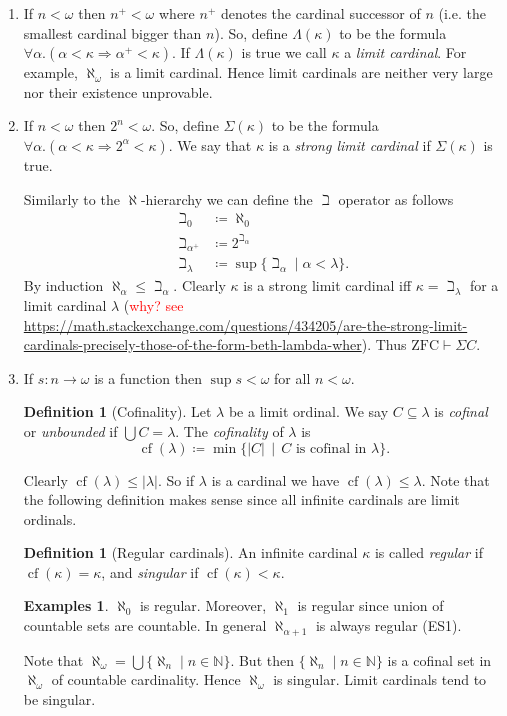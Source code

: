 \documentclass{report}
\DeclareMathOperator{\cf}{cf}
\theoremstyle{definition}
\theoremstyle{plain}
\theoremstyle{definition}
\newtheorem{defn}[thm]{Definition}
\newtheorem{egs}[thm]{Examples}
\begin{document}
	\begin{enumerate}
		\item If $n<\omega$ then $n^+ < \omega$ where $n^+$ denotes the cardinal successor of $n$ (i.e. the smallest cardinal bigger than $n$). So, define $\Lambda(\kappa)$ to be the formula $\forall \alpha. (\alpha < \kappa \Rightarrow \alpha^+ < \kappa)$. If $\Lambda(\kappa)$ is true we call $\kappa$ a \emph{limit cardinal}. For example, $\aleph_{\omega}$ is a limit cardinal. Hence limit cardinals are neither very large nor their existence unprovable.
		\item If $n<\omega$ then $2^n< \omega$. So, define $\Sigma(\kappa)$ to be the formula $\forall \alpha.(\alpha < \kappa \Rightarrow 2^{\alpha} < \kappa)$. We say that $\kappa$ is a \emph{strong limit cardinal} if $\Sigma(\kappa)$ is true.
		
		Similarly to the $\aleph$-hierarchy we can define the $\beth$ operator as follows
		\begin{align*}
			\beth_0 &\coloneqq \aleph_0\\
			\beth_{\alpha^+} &\coloneqq 2^{\beth_{\alpha}}\\
			\beth_{\lambda} &\coloneqq \sup\{\beth_\alpha \mid \alpha < \lambda\}. 
		\end{align*}
		By induction $\aleph_{\alpha} \leq \beth_{\alpha}$. Clearly $\kappa$ is a strong limit cardinal iff $\kappa = \beth_{\lambda}$ for a limit cardinal $\lambda$ (\textcolor{red}{why? see \url{https://math.stackexchange.com/questions/434205/are-the-strong-limit-cardinals-precisely-those-of-the-form-beth-lambda-wher}}). Thus $\text{ZFC} \vdash \Sigma C$.
		
		\item If $s\colon n \to \omega$ is a function then $\sup s < \omega$ for all $n<\omega$.
		\begin{defn}[Cofinality]
			Let $\lambda$ be a limit ordinal. We say $C\subseteq \lambda$ is \emph{cofinal} or \emph{unbounded} if $\bigcup C = \lambda$. The \emph{cofinality} of $\lambda$ is
			\[
				\cf(\lambda)\coloneqq \min\{|C| \,\mid \, C \text{ is cofinal in }\lambda\}.
			\]
		\end{defn}
		Clearly $\cf(\lambda)\leq |\lambda|$.  So if $\lambda$ is a cardinal we have $\cf(\lambda)\leq \lambda$. Note that the following definition makes sense since all infinite cardinals are limit ordinals.
		\begin{defn}[Regular cardinals]
			An infinite cardinal $\kappa$ is called \emph{regular} if $\cf(\kappa) = \kappa$, and \emph{singular} if $\cf(\kappa) < \kappa$.
		\end{defn}
		\begin{egs}
			$\aleph_0$ is regular. Moreover, $\aleph_1$ is regular since union of countable sets are countable. In general $\aleph_{\alpha+1}$ is always regular (ES1).
			
			Note that $\aleph_{\omega} = \bigcup\{\aleph_{n} \mid n\in \mathbb{N}\}$. But then $\{\aleph_{n} \mid n\in \mathbb{N}\}$ is a cofinal set in $\aleph_{\omega}$ of countable cardinality. Hence $\aleph_{\omega}$ is singular. Limit cardinals tend to be singular. 
		\end{egs}
	\end{enumerate}
\end{document}
